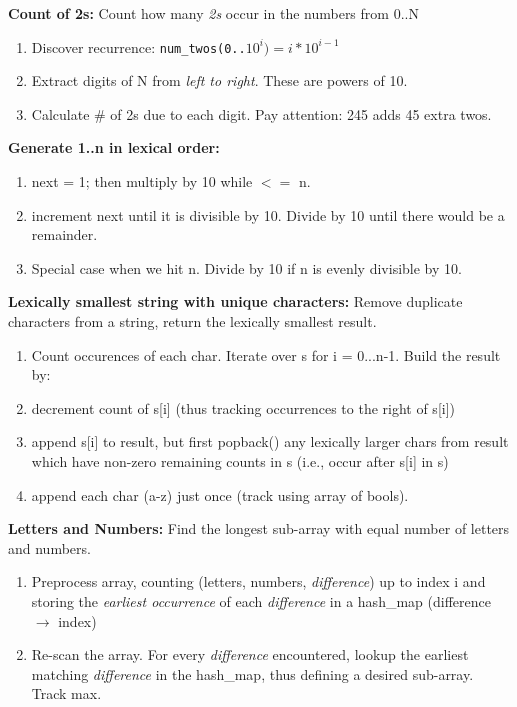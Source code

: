 \documentclass[12pt]{article}
\begin{document}
\vspace{5mm}
\noindent
\textbf{Count of 2s:}
Count how many \emph{2s} occur in the numbers from 0..N
\begin{enumerate}
\item Discover recurrence: \texttt{num\_twos(0..$10^i) = i*10^{i-1}$}
\item Extract digits of N from \emph{left to right}. These are powers of 10.
\item Calculate \# of 2s due to each digit. Pay attention: 245 adds 45 extra twos.
\end{enumerate}


\vspace{5mm}
\noindent
\textbf{Generate 1..n in lexical order:}
\begin{enumerate}
\item next = 1; then multiply by 10 while $<=$ n. 
\item increment next until it is divisible by 10. Divide by 10 until there would be a remainder.
\item Special case when we hit n. Divide by 10 if n is evenly divisible by 10.
\end{enumerate}


\vspace{5mm}
\noindent
\textbf{Lexically smallest string with unique characters:}
Remove duplicate characters from a string, return the lexically smallest result.
\begin{enumerate}
\item Count occurences of each char. Iterate over s for i = 0...n-1. Build the result by:
\item decrement count of s[i] (thus tracking occurrences to the right of s[i])
\item append s[i] to result, but first popback() any lexically larger chars from result which have non-zero remaining counts in s (i.e., occur after s[i] in s)
\item append each char (a-z) just once (track using array of bools).
\end{enumerate}


\vspace{5mm}
\noindent
\textbf{Letters and Numbers:}
Find the longest sub-array with equal number of letters and numbers.
\begin{enumerate}
\item Preprocess array, counting (letters, numbers, \emph{difference}) up to index i and storing
the \emph{earliest occurrence} of each \emph{difference} in a hash\_map (difference $\rightarrow$ index)
\item Re-scan the array. For every \emph{difference} encountered, lookup the earliest matching
\emph{difference} in the hash\_map, thus defining a desired sub-array. Track max.
\end{enumerate}
\end{document}
